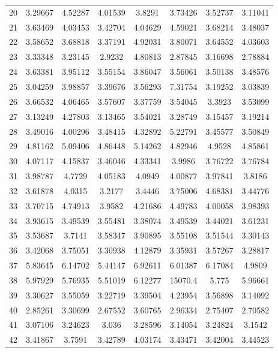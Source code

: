 \begin{center}
\begin{longtable}{cccccccc}
20 & 3.29667 & 4.52287 & 4.01539 & 3.8291 & 3.73426 & 3.52737 & 3.11041\\
21 & 3.63469 & 4.03453 & 3.42704 & 4.04629 & 4.59021 & 3.68214 & 3.48037\\
22 & 3.58652 & 3.68818 & 3.37191 & 4.92031 & 3.80071 & 3.64552 & 4.03603\\
23 & 3.33348 & 3.23145 & 2.9232 & 4.80813 & 2.87845 & 3.16698 & 2.78884\\
24 & 3.63381 & 3.95112 & 3.55154 & 3.86047 & 3.56061 & 3.50138 & 3.48576\\
25 & 3.04259 & 3.98857 & 3.39676 & 3.56293 & 7.31754 & 3.19252 & 3.03839\\
26 & 3.66532 & 4.06465 & 3.57607 & 3.37759 & 3.54045 & 3.3923 & 3.53099\\
27 & 3.13249 & 4.27803 & 3.13465 & 3.54021 & 3.28749 & 3.15457 & 3.19214\\
28 & 3.49016 & 4.00296 & 3.48415 & 4.32892 & 5.22791 & 3.45577 & 3.50849\\
29 & 4.81162 & 5.09406 & 4.86448 & 5.14262 & 4.82946 & 4.9528 & 4.85861\\
30 & 4.07117 & 4.15837 & 3.46046 & 4.33341 & 3.9986 & 3.76722 & 3.76784\\
31 & 3.98787 & 4.7729 & 4.05183 & 4.0949 & 4.00877 & 3.97841 & 3.8186\\
32 & 3.61878 & 4.0315 & 3.2177 & 3.4446 & 3.75006 & 4.68381 & 3.44776\\
33 & 3.70715 & 4.74913 & 3.9582 & 4.21686 & 4.49783 & 4.00058 & 3.98393\\
34 & 3.93615 & 3.49539 & 3.55481 & 3.38074 & 3.49539 & 3.44021 & 3.61231\\
35 & 3.53687 & 3.7141 & 3.58347 & 3.90895 & 3.55108 & 3.51544 & 3.30143\\
36 & 3.42068 & 3.75051 & 3.30938 & 4.12879 & 3.35931 & 3.57267 & 3.28817\\
37 & 5.83645 & 6.14702 & 5.44147 & 6.92611 & 6.01387 & 6.17084 & 4.9809\\
38 & 5.97929 & 5.76935 & 5.51019 & 6.12277 & 15070.4 & 5.775 & 5.96661\\
39 & 3.30627 & 3.55059 & 3.22719 & 3.39504 & 4.23954 & 3.56898 & 3.14092\\
40 & 2.85261 & 3.30699 & 2.67552 & 3.60765 & 2.96334 & 2.75407 & 2.70582\\
41 & 3.07106 & 3.24623 & 3.036 & 3.28596 & 3.14054 & 3.24824 & 3.1542\\
42 & 3.41867 & 3.7591 & 3.42789 & 4.03174 & 3.43471 & 3.42004 & 3.44523\\

\end{longtable}
\end{center}
